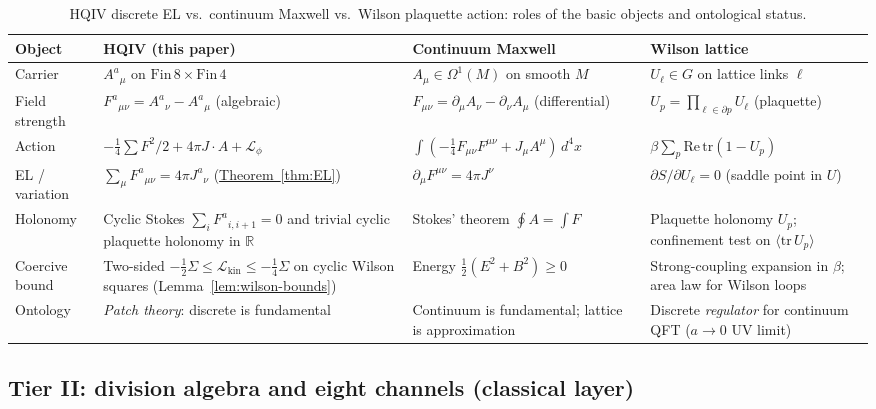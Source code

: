 \documentclass[11pt]{amsart}
\begin{document}
\begin{table}[ht]
\caption{HQIV discrete EL vs.\ continuum Maxwell vs.\ Wilson plaquette action: roles of the basic objects and ontological status.}
\label{tab:dictionary}
\centering
\footnotesize
\begin{tabular}{@{}p{3.0cm}p{3.4cm}p{3.4cm}p{3.4cm}@{}}
\hline
Object & HQIV (this paper) & Continuum Maxwell & Wilson lattice \cite{wilson1974,creutz1983}\\
\hline
Carrier & \(A^a{}_\mu\) on \(\mathrm{Fin}\,8\times\mathrm{Fin}\,4\) & \(A_\mu\in\Omega^1(M)\) on smooth \(M\) & \(U_\ell\in G\) on lattice links \(\ell\)\\
Field strength & \(F^a{}_{\mu\nu}=A^a{}_\nu-A^a{}_\mu\) (algebraic) & \(F_{\mu\nu}=\partial_\mu A_\nu-\partial_\nu A_\mu\) (differential) & \(U_p=\prod_{\ell\in\partial p}U_\ell\) (plaquette) \\
Action & \(-\tfrac{1}{4}\sum F^2/2 + 4\pi J\!\cdot\!A + \mathcal{L}_\phi\) & \(\int(-\tfrac{1}{4}F_{\mu\nu}F^{\mu\nu}+J_\mu A^\mu)\,d^4x\) & \(\beta\sum_p\mathrm{Re}\,\mathrm{tr}(1-U_p)\) \\
EL / variation & \(\sum_\mu F^a{}_{\mu\nu}=4\pi J^a{}_\nu\) (\hyperref[lean:EL-divergence]{Theorem~\ref{thm:EL}}) & \(\partial_\mu F^{\mu\nu}=4\pi J^\nu\) & \(\partial S/\partial U_\ell=0\) (saddle point in \(U\)) \\
Holonomy & Cyclic Stokes \(\sum_i F^a{}_{i,i+1}=0\) and trivial cyclic plaquette holonomy in \(\mathbb{R}\) & Stokes' theorem \(\oint A=\int F\) & Plaquette holonomy \(U_p\); confinement test on \(\langle\mathrm{tr}\,U_p\rangle\) \\
Coercive bound & Two-sided \(-\tfrac12\Sigma\le\mathcal{L}_{\mathrm{kin}}\le-\tfrac14\Sigma\) on cyclic Wilson squares (Lemma~\ref{lem:wilson-bounds}) & Energy \(\tfrac12(E^2+B^2)\ge 0\) & Strong-coupling expansion in \(\beta\); area law for Wilson loops \\
Ontology & \emph{Patch theory}: discrete is fundamental & Continuum is fundamental; lattice is approximation & Discrete \emph{regulator} for continuum QFT (\(a\to 0\) UV limit) \\
\hline
\end{tabular}
\end{table}

\subsection{Tier II: division algebra and eight channels (classical layer)}
\end{document}
